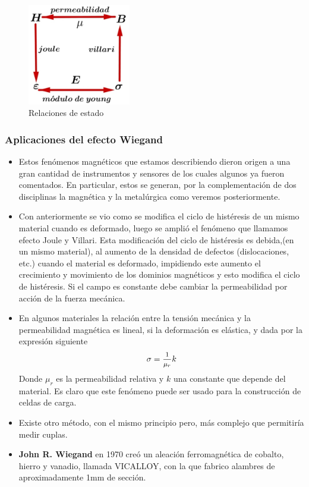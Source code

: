 \begin{figure}[H]
    \centering
    \includegraphics[width=0.4\textwidth]{./Figures/ecDeEstado}
	\caption{Relaciones de estado}
	\label{fig:ecDeEstado}
\end{figure}


\subsubsection{Aplicaciones del efecto Wiegand}

\begin{itemize}
	\item Estos fenómenos magnéticos que estamos describiendo dieron origen a una gran cantidad de instrumentos y sensores de los cuales algunos ya fueron comentados. En particular, estos se generan, por la complementación de dos disciplinas la magnética y la metalúrgica como veremos posteriormente.

	\item Con anteriormente se vio como se modifica el ciclo de histéresis de un mismo material cuando es deformado, luego se amplió el fenómeno que llamamos efecto Joule y Villari. Esta modificación del ciclo de histéresis es debida,(en un mismo material), al aumento de la densidad de defectos (dislocaciones, etc.) cuando el material es deformado, impidiendo este aumento el crecimiento y movimiento de los dominios magnéticos y esto modifica el ciclo de histéresis. Si el campo es constante debe cambiar la permeabilidad por acción de la fuerza mecánica.

	\item En algunos materiales la relación entre la tensión mecánica y la permeabilidad magnética es lineal, si la deformación es elástica, y dada por la expresión siguiente
	\begin{equation}
	\sigma=\mfrac{1}{\mu_{r}}k
	\end{equation}
Donde $\mu_{r}$ es la permeabilidad relativa y $k$ una constante que depende del material. Es claro que este fenómeno puede ser usado para la construcción de celdas de carga.

	\item Existe otro método, con el mismo principio pero, más complejo que permitiría medir cuplas.

	\item \textbf{John R. Wiegand} en 1970 creó un aleación ferromagnética de cobalto, hierro y vanadio, llamada VICALLOY, con la que fabrico alambres de aproximadamente 1mm de sección.

\end{itemize}

